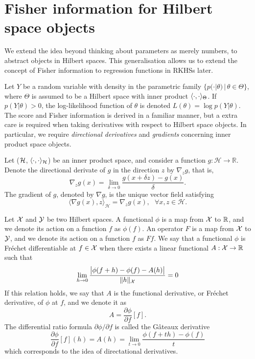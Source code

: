 \documentclass[a4paper,showframe,11pt,draft]{report}
\begin{document}
\section{Fisher information for Hilbert space objects}

We extend the idea beyond thinking about parameters as merely numbers, to abstract objects in Hilbert spaces. 
This generalisation allows us to extend the concept of Fisher information to regression functions in RKHSs later.

Let $Y$ be a random variable with density in the parametric family $\{p(\cdot|\theta) \,|\, \theta \in \Theta \}$, where $\Theta$ is assumed to be a Hilbert space with inner product $\langle\cdot,\cdot\rangle_\Theta$.
If $p(Y|\theta) > 0$, the log-likelihood function of $\theta$ is denoted $L(\theta) = \log p(Y|\theta)$. 
The score and Fisher information is derived in a familiar manner, but a extra care is required when taking derivatives with respect to Hilbert space objects.  
In particular, we require \emph{directional derivatives} and \emph{gradients} concerning inner product space objects.

\begin{definition}
  Let (${\mathcal H}$, $\langle\cdot,\cdot\rangle_{\mathcal H}$) be an inner product space, and consider a function $g:\mathcal H \rightarrow \mathbb R$. 
  Denote the directional derivate of $g$ in the direction $z$ by $\nabla_z g$, that is, 
	\[
		\nabla_z g(x) = \lim_{\delta \rightarrow 0} \frac{g(x + \delta z) - g(x)}{\delta}.
	\]
	The gradient of $g$, denoted by $\nabla g$, is the unique vector field satisfying 
	\[
		\langle \nabla g(x), z \rangle_{\mathcal H} = \nabla_z g(x), \ \ \ \forall x,z \in \mathcal H.
	\]
\end{definition}

\begin{definition}
  Let ${\mathcal X}$ and ${\mathcal Y}$ be two Hilbert spaces.
  A functional $\phi$ is a map from ${\mathcal X}$ to $\mathbb{R}$, and we denote its action on a function $f$ as $\phi(f)$.
  An operator $F$ is a map from ${\mathcal X}$ to ${\mathcal Y}$, and we denote its action on a function $f$ as $Ff$.
  We say that a functional $\phi$ is Fréchet differentiable at $f \in {\mathcal X}$ when there exists a linear functional $A:{\mathcal X}\to\mathbb{R}$ such that
  \[
    \lim_{h\to 0} \frac{\big\vert \phi(f+h) - \phi(f) - A(h) \big\vert}{\lVert h\rVert_{\mathcal X}} = 0
  \]
  If this relation holds, we say that $A$ is the functional derivative, or Fréchet derivative, of $\phi$ at $f$, and we denote it as 
  \[
    A = \frac{\partial\phi}{\partial f}[f].
  \]
  The differential ratio formula $\partial\phi/\partial f$ is called the Gâteaux derivative
  \[
    \frac{\partial\phi}{\partial f}[f](h) = A(h) = \lim_{t\to 0} \frac{\phi(f+th)-\phi(f)}{t}
  \]
  which corresponds to the idea of directational derivatives.
\end{definition}
\end{document}

